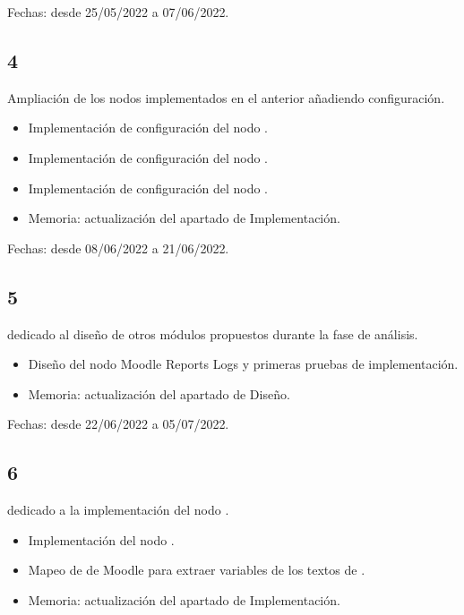 Fechas: desde 25/05/2022 a 07/06/2022.

\subsection{ 4}

Ampliación de los nodos implementados en el  anterior añadiendo configuración. 

\begin{itemize}
	\item Implementación de configuración del nodo .
	\item Implementación de configuración del nodo .
	\item Implementación de configuración del nodo .
	\item Memoria: actualización del apartado de Implementación. 
\end{itemize}

Fechas: desde 08/06/2022 a 21/06/2022.

\subsection{ 5}

 dedicado al diseño de otros módulos propuestos durante la fase de análisis. 

\begin{itemize}
	\item Diseño del nodo Moodle Reports Logs y primeras pruebas de implementación. 
	\item Memoria: actualización del apartado de Diseño.
\end{itemize}

Fechas: desde 22/06/2022 a 05/07/2022.

\subsection{ 6}

 dedicado a la implementación del nodo . 

\begin{itemize}
	\item Implementación del nodo . 
	\item Mapeo de  de Moodle para extraer variables de los textos de . 
	\item Memoria: actualización del apartado de Implementación. 
\end{itemize}

